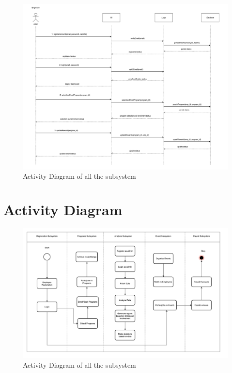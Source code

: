 \begin{figure}[h!t]
    \centering
    \includegraphics[width=\textwidth]{images/sequenceDiagram.png}
    \caption{Activity Diagram of all the subsystem}
    \label{fig:sequenceDiagram}
\end{figure}


\section{Activity Diagram}

\begin{figure}[h!t]
    \centering
    \includegraphics[width=\textwidth]{images/activityDiagram.png}
    \caption{Activity Diagram of all the subsystem}
    \label{fig:activityDiagram}
\end{figure}

